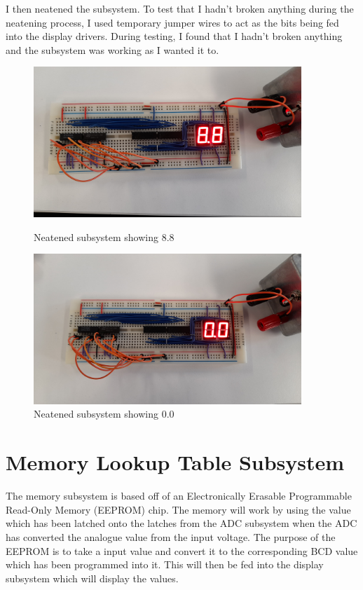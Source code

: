 \noindent I then neatened the subsystem. To test that I hadn't broken anything during the neatening process, I used temporary jumper wires to act as the bits being fed into the display drivers. During testing, I found that I hadn't broken anything and the subsystem was working as I wanted it to.
\begin{figure} [H]
    \centering
    \begin{minipage}[t]{0.45\textwidth}
        \centering
        \includegraphics[width=0.9\textwidth]{images/displayTesting3.jpg}
        \caption{Neatened subsystem showing 8.8}
        \label{fig:displayTesting3}
    \end{minipage}\hfill
    \begin{minipage}[t] {0.45\textwidth}
        \centering
        \includegraphics[width=0.9\textwidth]{images/displayTesting4.jpg}
        \caption{Neatened subsystem showing 0.0}
        \label{fig:displayTesting4}
    \end{minipage}
\end{figure}



\section{Memory Lookup Table Subsystem}
The memory subsystem is based off of an Electronically Erasable Programmable Read-Only Memory (EEPROM) chip.
The memory will work by using the value which has been latched onto the latches from the ADC subsystem when the ADC has converted the analogue value from the input voltage.
The purpose of the EEPROM is to take a input value and convert it to the corresponding BCD value which has been programmed into it. 
This will then be fed into the display subsystem which will display the values.
